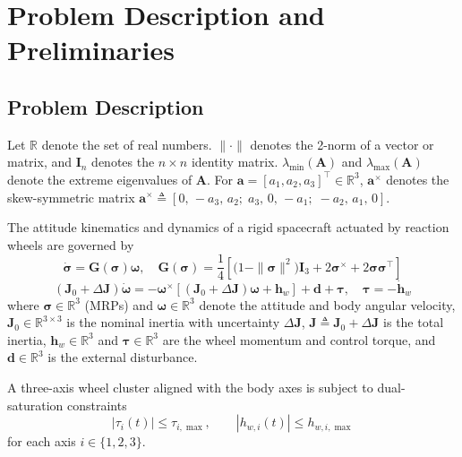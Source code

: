 \documentclass[journal]{new-aiaa}
\begin{document}
\section{Problem Description and Preliminaries}
\label{section:PROBLEM}

\subsection{Problem Description}
Let $\mathbb{R}$ denote the set of real numbers.
$\|\cdot\|$ denotes the 2-norm of a vector or matrix, and
$\boldsymbol{I}_n$ denotes the $n\times n$ identity matrix.
$\lambda_{\min}(\boldsymbol{A})$ and $\lambda_{\max}(\boldsymbol{A})$ denote the extreme eigenvalues of $\boldsymbol{A}$.
For $\boldsymbol{a}=[a_1,a_2,a_3]^\top\in\mathbb{R}^3$,
$\boldsymbol{a}^{\times}$ denotes the skew-symmetric matrix
$\boldsymbol{a}^{\times} \triangleq [0,\,-a_3,\,a_2;\; a_3,\,0,\,-a_1;\; -a_2,\,a_1,\,0]$.

The attitude kinematics and dynamics of a rigid spacecraft actuated by reaction wheels are governed by
\begin{equation}
\dot{\boldsymbol{\sigma}} = \boldsymbol{G}(\boldsymbol{\sigma}) \boldsymbol{\omega},
\quad \boldsymbol{G}(\boldsymbol{\sigma}) = \frac{1}{4} \left[ \big(1 - \|\boldsymbol{\sigma}\|^2 \big) \boldsymbol{I}_3 + 2 {\boldsymbol{\sigma}}^{\times} + 2 \boldsymbol{\sigma} \boldsymbol{\sigma}^\top \right]
\label{eq:attitude_kinematics}
\end{equation}
\begin{equation}
(\boldsymbol{J}_0 + \Delta\boldsymbol{J}) \dot{\boldsymbol{\omega}} =
- \boldsymbol{\omega}^{\times} [(\boldsymbol{J}_0 + \Delta\boldsymbol{J}) \boldsymbol{\omega} + \boldsymbol{h}_w ]
+ \boldsymbol{d} + \boldsymbol{\tau}, \quad \boldsymbol{\tau} = -\dot{\boldsymbol{h}}_w
\label{eq:attitude_dynamics}
\end{equation}
where $\boldsymbol{\sigma}\in\mathbb{R}^3$ (MRPs) and $\boldsymbol{\omega}\in\mathbb{R}^3$ denote the attitude and body angular velocity,
$\boldsymbol{J}_0\in\mathbb{R}^{3\times 3}$ is the nominal inertia with uncertainty $\Delta\boldsymbol{J}$,
$\boldsymbol{J}\triangleq\boldsymbol{J}_0+\Delta\boldsymbol{J}$ is the total inertia,
$\boldsymbol{h}_w\in\mathbb{R}^3$ and $\boldsymbol{\tau}\in\mathbb{R}^3$ are the wheel momentum and control torque,
and $\boldsymbol{d}\in\mathbb{R}^3$ is the external disturbance.

A three-axis wheel cluster aligned with the body axes is subject to dual-saturation constraints
\begin{equation}
|\tau_i(t)| \le \tau_{i,\max}, \qquad
|h_{w,i}(t)| \le h_{w,i,\max}
\label{eq:dual_saturation}
\end{equation}
for each axis $i\in\{1,2,3\}$.
\end{document}
